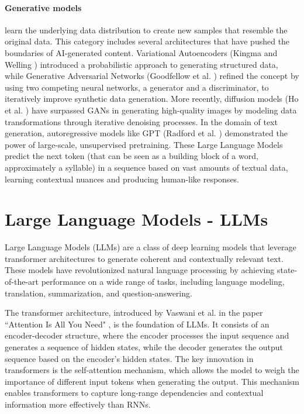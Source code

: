\paragraph{Generative models}
learn the underlying data distribution to create new samples that resemble the
original data. This category includes several architectures that have pushed the
boundaries of AI-generated content. Variational Autoencoders (Kingma and Welling
\cite{kingma2022autoencodingvariationalbayes}) introduced a probabilistic
approach to generating structured data, while Generative Adversarial Networks (Goodfellow
et al. \cite{goodfellow2014generativeadversarialnetworks}) refined the concept
by using two competing neural networks, a generator and a discriminator, to
iteratively improve synthetic data generation. More recently, diffusion models (Ho
et al. \cite{ho2020denoisingdiffusionprobabilisticmodels}) have surpassed GANs in
generating high-quality images by modeling data transformations through iterative
denoising processes. In the domain of text generation, autoregressive models like
GPT (Radford et al. \cite{radford2018improving}) demonstrated the power of large-scale,
unsupervised pretraining. These Large Language Models predict the next token (that
can be seen as a building block of a word, approximately a syllable) in a sequence
based on vast amounts of textual data, learning contextual nuances and producing
human-like responses.

\section{Large Language Models - LLMs}
\label{sec:large_language_models_llms}

Large Language Models (LLMs) are a class of deep learning models that leverage transformer
architectures to generate coherent and contextually relevant text. These models
have revolutionized natural language processing by achieving state-of-the-art
performance on a wide range of tasks, including language modeling, translation, summarization,
and question-answering.

The transformer architecture, introduced by Vaswani et al. in the paper ``Attention
Is All You Need" \cite{vaswani2023attentionneed}, is the foundation of LLMs. It consists
of an encoder-decoder structure, where the encoder processes the input sequence
and generates a sequence of hidden states, while the decoder generates the output
sequence based on the encoder's hidden states. The key innovation in
transformers is the self-attention mechanism, which allows the model to weigh the
importance of different input tokens when generating the output. This mechanism
enables transformers to capture long-range dependencies and contextual
information more effectively than RNNs.

